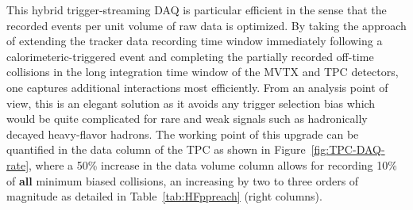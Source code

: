 This hybrid trigger-streaming DAQ is particular efficient in the sense that the recorded events per unit volume of raw data is optimized.  By taking the approach of extending the tracker data recording time window immediately following a calorimeteric-triggered event and completing the partially recorded off-time collisions in the long integration time window of the MVTX and TPC detectors, one captures additional interactions most efficiently. 
From an analysis point of view, this is an elegant solution as it avoids any trigger selection bias which would be quite complicated for rare and weak signals such as hadronically decayed heavy-flavor hadrons.
The working point of this upgrade can be quantified in the data column of the TPC as shown in Figure~\ref{fig:TPC-DAQ-rate}, where a 50\% increase in the data volume column allows for recording 10\% of {\bf all} minimum biased collisions, an increasing by two to three orders of magnitude as detailed in Table~\ref{tab:HFppreach} (right columns). 

 



 




